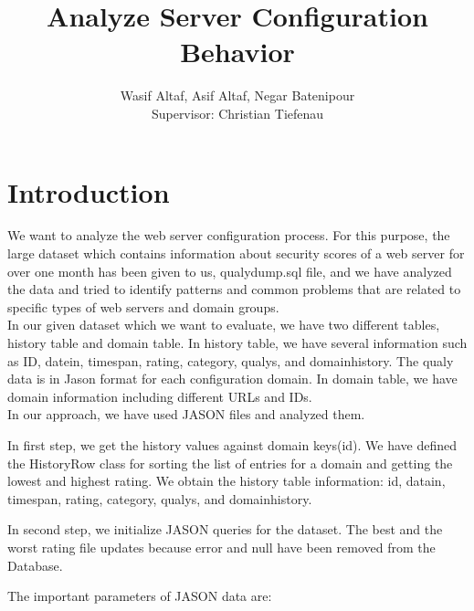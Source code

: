 \documentclass[journal]{IEEEtran}
\begin{document}
\title{Analyze Server Configuration Behavior\\ }


\author{Wasif Altaf,
        Asif Altaf,
        Negar Batenipour\\ Supervisor: Christian Tiefenau}


\maketitle



\IEEEpeerreviewmaketitle



\section{Introduction}
\label{sec:Introduction}

We want to analyze the web server configuration process. For this purpose, the large dataset which contains information about security scores of a web server for over one month has been given to us, qualydump.sql file, and we have analyzed the data and tried to identify patterns and common problems that are related to specific types of web servers and domain groups.\\

In our given dataset which we want to evaluate, we have two different tables, history table and domain table. 
In history table, we have several information such as ID, datein, timespan, rating, category, qualys, and domainhistory. The qualy data is in Jason format for each configuration domain. 
In domain table, we have domain information including different URLs and IDs. \\


In our approach, we have used JASON files and analyzed them. 

In first step, we get the history values against domain keys(id). We have defined the HistoryRow class for sorting the list of entries for a domain and getting the lowest and highest rating. We obtain the history table information: id, datain, timespan, rating, category, qualys, and domainhistory. 

In second step, we initialize JASON queries for the dataset. The best and the worst rating file updates because error and null have been removed from the Database.

The important parameters of JASON data are:\\
\end{document}
